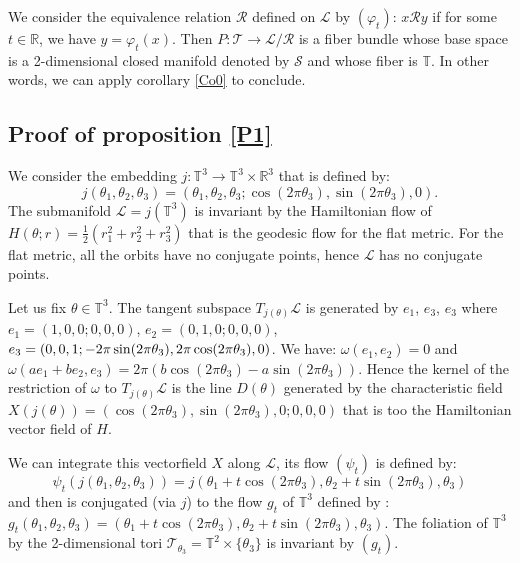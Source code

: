 \documentclass{dcds}
\theoremstyle{definition}
\begin{document}
We   consider the equivalence   relation  ${\mathcal {R}}$ defined on ${\mathcal {L}}$ by $(\varphi_t)$: $x{\mathcal {R}} y$ if for some $t\in{\mathbb {R}}$, we have $y=\varphi_t(x)$. Then $P:{\mathcal {T}}\rightarrow {\mathcal {L}}/{\mathcal {R}}$ is a fiber bundle whose base space is  a 2-dimensional   closed manifold denoted by ${\mathcal {S}}$ and whose fiber is ${\mathbb {T}}$.  In other words, we can apply corollary \ref{Co0} to conclude.

\subsection{Proof of proposition \ref{P1}}
We  consider the embedding $j: {\mathbb {T}}^3\rightarrow {\mathbb {T}}^3\times {\mathbb {R}}^3$ that is defined by:
$$j(\theta_1, \theta_2, \theta_3)= (\theta_1, \theta_2, \theta_3; \cos(2\pi\theta_3), \sin(2\pi\theta_3), 0).$$
The submanifold ${\mathcal {L}}=j({\mathbb {T}}^3)$ is invariant by the Hamiltonian flow of $H(\theta;r)=\frac{1}{2}(r_1^2+r_2^2+r_3^2)$ that is the geodesic flow for the flat metric. For the flat metric, all the orbits have no conjugate points, hence ${\mathcal {L}}$ has  no conjugate points.

Let us fix $\theta\in{\mathbb {T}}^3$. The tangent subspace  $T_{j(\theta)}{\mathcal {L}}$ is generated by $e_1$, $e_3$, $e_3$ where $e_1=(1, 0,0;0,0,0)$, $e_2=(0, 1, 0; 0,0,0)$,
 $e_3= (0, 0, 1; -2\pi\sin(2\pi\theta_3), 2\pi\cos(2\pi\theta_3),\break 0)$. We have:  $\omega(e_1, e_2)=0$ and $\omega (ae_1+be_2, e_3)=2\pi(b\cos(2\pi\theta_3)-a\sin(2\pi\theta_3))$. Hence the kernel of the restriction of $\omega$ to $T_{j(\theta)}{\mathcal {L}}$ is the line $D(\theta)$ generated by the characteristic field $X(j(\theta))=(\cos(2\pi\theta_3), \sin(2\pi\theta_3), 0;0,0,0)$ that is too the Hamiltonian vector field of $H$.

We can integrate this vectorfield $X$ along ${\mathcal {L}}$, its flow $(\psi_t)$ is defined by: $$\psi_t(j(\theta_1, \theta_2, \theta_3))=j(\theta_1+t\cos(2\pi\theta_3), \theta_2+t\sin(2\pi\theta_3), \theta_3)$$ and then is conjugated (via $j$) to the   flow $g_t$ of ${\mathbb {T}}^3$ defined by :  $g_t(\theta_1, \theta_2, \theta_3)=(\theta_1+t\cos(2\pi\theta_3), \theta_2+t\sin(2\pi\theta_3), \theta_3)$. The foliation of ${\mathbb {T}}^3$ by the 2-dimensional tori ${\mathcal {T}}_{\theta_3}={\mathbb {T}}^2\times\{ \theta_3\}$ is invariant by $(g_t)$.
\end{document}

